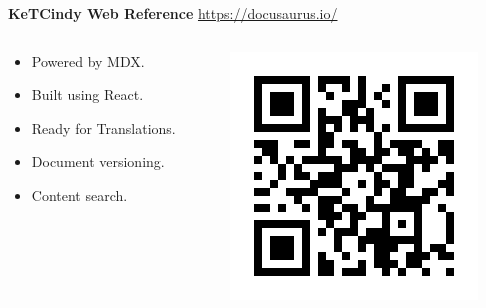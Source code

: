 \documentclass[dvipdfmx, unicode]{beamer}
\begin{document}
\begin{frame}[t]{\bfseries KeTCindy Web Reference}
  \url{https://docusaurus.io/}
  \begin{columns}[T]
    \begin{column}{0.5\linewidth}
      \centering
      \begin{itemize}
        \item Powered by MDX.
        \item Built using React.
        \item Ready for Translations.
        \item Document versioning.
        \item Content search.
      \end{itemize}
    \end{column}
    \begin{column}{0.5\linewidth}
      \centering
      \includegraphics[width=\linewidth]{img/DocQR.png}
    \end{column}
  \end{columns}
\end{frame}
\end{document}
